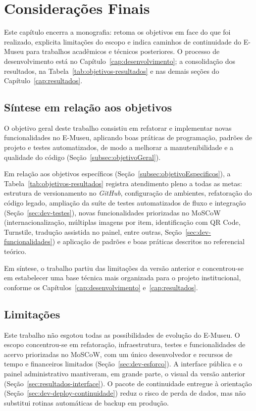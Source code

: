 \chapter{Considerações Finais}\label{cap:consideracoesfinais}

Este capítulo encerra a monografia: retoma os objetivos em face do que foi realizado, explicita limitações do escopo e indica caminhos de continuidade do E-Museu para trabalhos acadêmicos e técnicos posteriores. O processo de desenvolvimento está no Capítulo~\ref{cap:desenvolvimento}; a consolidação dos resultados, na Tabela~\ref{tab:objetivos-resultados} e nas demais seções do Capítulo~\ref{cap:resultados}.


\section{Síntese em relação aos objetivos}\label{sec:conclusao-objetivos}

O objetivo geral deste trabalho consistiu em refatorar e implementar novas funcionalidades no E-Museu, aplicando boas práticas de programação, padrões de projeto e testes automatizados, de modo a melhorar a manutenibilidade e a qualidade do código (Seção~\ref{subsec:objetivoGeral}).

Em relação aos objetivos específicos (Seção~\ref{subsec:objetivoEspecificos}), a Tabela~\ref{tab:objetivos-resultados} registra atendimento pleno a todas as metas: estrutura de versionamento no \textit{GitHub}, configuração de ambientes, refatoração do código legado, ampliação da suíte de testes automatizados de fluxo e integração (Seção~\ref{sec:dev-testes}), novas funcionalidades priorizadas no MoSCoW (internacionalização, múltiplas imagens por item, identificação com QR Code, Turnstile, tradução assistida no painel, entre outras, Seção~\ref{sec:dev-funcionalidades}) e aplicação de padrões e boas práticas descritos no referencial teórico.

Em síntese, o trabalho partiu das limitações da versão anterior \cite{gonzaga2024} e concentrou-se em estabelecer uma base técnica mais organizada para o projeto institucional, conforme os Capítulos~\ref{cap:desenvolvimento} e~\ref{cap:resultados}.


\section{Limitações}\label{sec:conclusao-limitacoes}

Este trabalho não esgotou todas as possibilidades de evolução do E-Museu. O escopo concentrou-se em refatoração, infraestrutura, testes e funcionalidades de acervo priorizadas no MoSCoW, com um único desenvolvedor e recursos de tempo e financeiros limitados (Seção~\ref{sec:dev-esforco}). A interface pública e o painel administrativo mantiveram, em grande parte, o visual da versão anterior (Seção~\ref{sec:resultados-interface}). O pacote de continuidade entregue à orientação (Seção~\ref{sec:dev-deploy-continuidade}) reduz o risco de perda de dados, mas não substitui rotinas automáticas de backup em produção.


